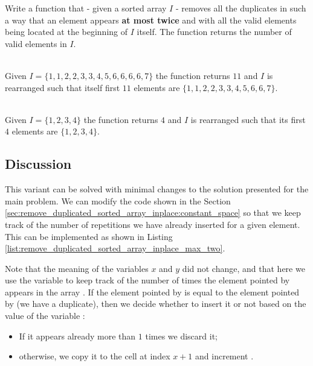 \begin{exercise}
Write a function that  -  given a sorted array $I$  - removes all the 
duplicates in such a way that an element appears \textbf{at most twice} and with all the valid elements being located at the beginning of $I$ itself.
The function returns the number of valid elements in $I$.
	
	\label{example:remove_duplicated_sorted_array_inplace:exercice2}
	
		\begin{example}
			\label{example:remove_duplicated_sorted_array_inplace_variation1:example1}
			\hfill \\
			Given $I=\{1,1,2,2,3,3,4,5,6,6,6,6,7\}$ the function returns $11$ and $I$ is rearranged such
			that itself first $11$ elements are $\{1,1,2,2,3,3,4,5,6,6,7\}$.				
		\end{example}
	
		\begin{example}
			\label{example:remove_duplicated_sorted_array_inplace_variation1:example2}
			\hfill \\
			Given $I=\{1,2,3,4\}$ the function returns $4$ and $I$ is rearranged such that its first $4$
			elements are $\{1,2,3,4\}$.	
		\end{example}
\end{exercise}

\subsection{Discussion}

This variant can be solved with minimal changes to the solution presented for the main problem.
We can modify the code shown in the Section \ref{sec:remove_duplicated_sorted_array_inplace:constant_space} so that we keep track of the number of repetitions we have already inserted for a given element.
This can be implemented as shown in Listing \ref{list:remove_duplicated_sorted_array_inplace_max_two}.




Note that the meaning of the variables $x$ and $y$ did not change, and that here we use the variable  to keep track of the number of times the element pointed by  appears in the array . 
If the element pointed by  is equal to the element pointed by  (we have a duplicate), then we decide whether to insert it or not based on the value of the variable :
\begin{itemize}
	\item If it appears already more than $1$ times we discard it;
	\item otherwise, we copy it to the cell at index $x+1$ and increment .
\end{itemize}

